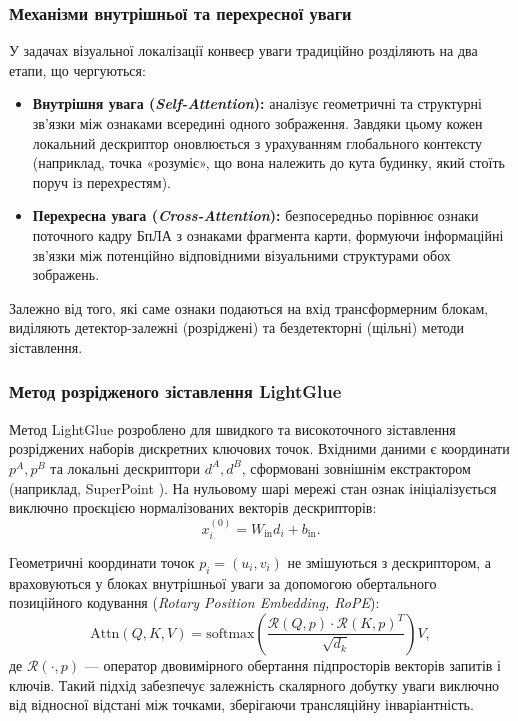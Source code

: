 \documentclass[a4paper, 12pt, titlepage]{article}
\begin{document}
\subsubsection{Механізми внутрішньої та перехресної уваги}
У задачах візуальної локалізації конвеєр уваги традиційно розділяють на два етапи, що чергуються:
\begin{itemize}
    \item \textbf{Внутрішня увага (\textit{Self-Attention}):} аналізує геометричні та структурні зв'язки між ознаками всередині одного зображення. Завдяки цьому кожен локальний дескриптор оновлюється з урахуванням глобального контексту (наприклад, точка «розуміє», що вона належить до кута будинку, який стоїть поруч із перехрестям).
    \item \textbf{Перехресна увага (\textit{Cross-Attention}):} безпосередньо порівнює ознаки поточного кадру БпЛА з ознаками фрагмента карти, формуючи інформаційні зв'язки між потенційно відповідними візуальними структурами обох зображень.
\end{itemize}

Залежно від того, які саме ознаки подаються на вхід трансформерним блокам, виділяють детектор-залежні (розріджені) та бездетекторні (щільні) методи зіставлення.

\subsubsection{Метод розрідженого зіставлення LightGlue}
Метод LightGlue \cite{lightglue} розроблено для швидкого та високоточного зіставлення розріджених наборів дискретних ключових точок. Вхідними даними є координати $p^A, p^B$ та локальні дескриптори $d^A, d^B$, сформовані зовнішнім екстрактором (наприклад, SuperPoint \cite{superpoint}). На нульовому шарі мережі стан ознак ініціалізується виключно проєкцією нормалізованих векторів дескрипторів:
\begin{equation}
x_i^{(0)} = W_{\text{in}} d_i + b_{\text{in}}.
\end{equation}

Геометричні координати точок $p_i = (u_i, v_i)$ не змішуються з дескриптором, а враховуються у блоках внутрішньої уваги за допомогою обертального позиційного кодування (\textit{Rotary Position Embedding, RoPE}):
\begin{equation}
\text{Attn}(Q, K, V) = \text{softmax}\left( \frac{\mathcal{R}(Q, p) \cdot \mathcal{R}(K, p)^T}{\sqrt{d_k}} \right) V,
\end{equation}
де $\mathcal{R}(\cdot, p)$ --- оператор двовимірного обертання підпросторів векторів запитів і ключів. Такий підхід забезпечує залежність скалярного добутку уваги виключно від відносної відстані між точками, зберігаючи трансляційну інваріантність.
\end{document}
